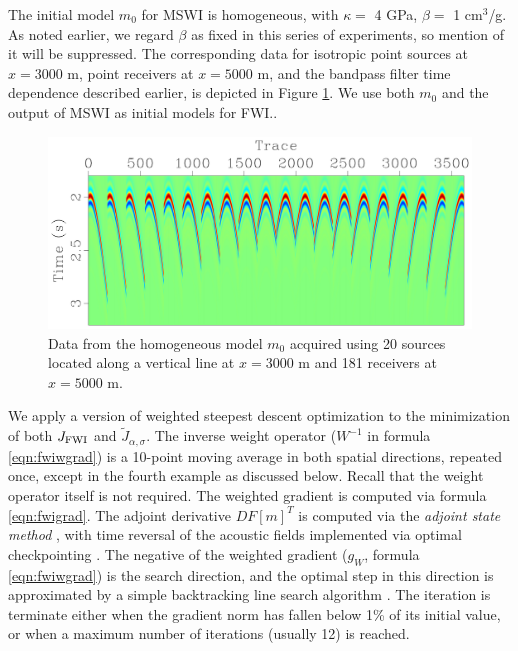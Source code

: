 The initial model $m_0$ for MSWI is homogeneous, with $\kappa = $ 4
GPa, $\beta = $ 1 cm$^3$/g. As noted earlier, we regard $\beta$ as
fixed in this series of experiments, so mention of it will be
suppressed. The corresponding data for isotropic point sources at $x=3000$ m,
point receivers at $x=5000$ m, and the bandpass filter time dependence
described earlier, is depicted in
Figure \ref{fig:chwd20}. We use both $m_0$ and the output of MSWI as
initial models for FWI..

\begin{figure}[H]   
\begin{center}
\includegraphics[width=\textwidth]{project/Fig/chwd20}
\caption{Data from the homogeneous model $m_0$ acquired using 20 sources located along a vertical line at $x=3000$ m and 181 receivers at $x=5000$ m.}
\label{fig:chwd20}
\end{center}
\end{figure}


We apply a version of weighted steepest descent optimization to the
minimization of both $J_{\rm FWI}$ and $\tilde{J}_{\alpha,\sigma}$.
The inverse weight operator ($W^{-1}$
in formula \ref{eqn:fwiwgrad}) is a
10-point moving average in both spatial directions, repeated once,
except in the fourth example as discussed below. Recall that the weight operator itself is not required. The weighted
gradient is computed via formula \ref{eqn:fwigrad}. The adjoint
derivative $DF[m]^T$ is computed via the {\em adjoint state method}
\cite[]{Chavent:74,GauTarVir:86}, with time reversal of the acoustic fields
implemented via optimal checkpointing
\cite[]{Griewank:92,Griewank:book,Symes:06a-pub}. The negative of the weighted
gradient ($g_W$, formula \ref{eqn:fwiwgrad}) is the search direction,
and the optimal step in this direction is approximated by a simple
backtracking line search algorithm \cite[]{NocedalWright}. The
iteration is terminate either when the gradient norm has fallen below
1\% of its initial value, or when a maximum number of iterations
(usually 12) is reached.

